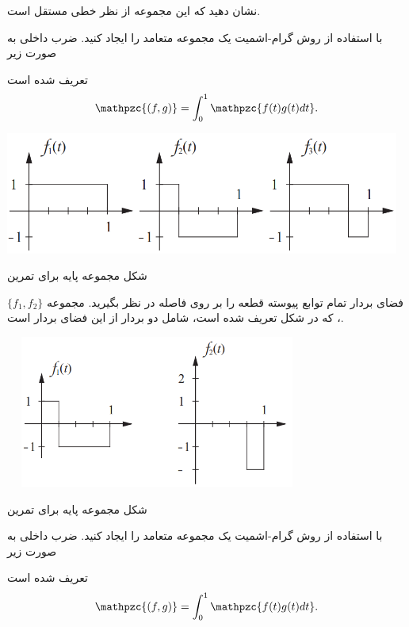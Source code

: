 \documentclass[a4paper,12pt]{report}
\begin{document}
		\textbf{}			
		نشان دهید که این مجموعه از نظر خطی مستقل است.
		
		\textbf{}
		با استفاده از روش گرام-اشمیت یک مجموعه متعامد را ایجاد کنید. ضرب داخلی به صورت زیر
		
		\hspace{0.4cm}
		 تعریف شده است
		$$
		\mathpzc{(f,g)}=\int_{0}^{1}\mathpzc{f(t)g(t)dt}.
		$$
		
		\begin{center}
			\hspace{-2cm}\includegraphics[width=13cm, height=4cm]{151-1}
			
			شکل  مجموعه پایه برای تمرین 
		\end{center}
	
	
	\hspace{-2.5cm}\textbf{}\hspace{0.6cm}
	فضای بردار تمام توابع پیوسته قطعه را بر روی فاصله \lr{[0,1]} در نظر بگیرید. مجموعه 
	$ \{f_1,f_2\} $
	 ، که در شکل  تعریف شده است، شامل دو بردار از این فضای بردار است.
	 \begin{center}
	 	\hspace{-2cm}\includegraphics[width=10cm, height=5cm]{151-2}
	 	
	 	شکل  مجموعه پایه برای تمرین 
	 \end{center}
 
 	\textbf{}
 با استفاده از روش گرام-اشمیت یک مجموعه متعامد را ایجاد کنید. ضرب داخلی به صورت زیر
 
 \hspace{0.3cm}
  تعریف شده است
	 $$
	 \mathpzc{(f,g)}=\int_{0}^{1}\mathpzc{f(t)g(t)dt}.
	 $$
	 
\end{document}
